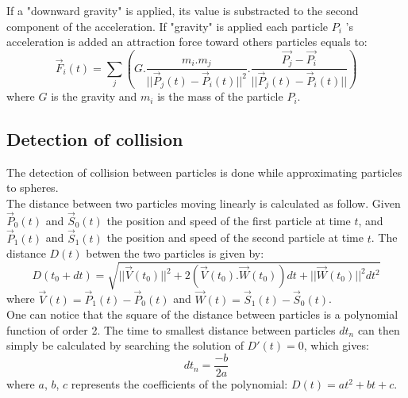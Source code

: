 If a "downward gravity" is applied, its value is substracted to the second component of the acceleration. If "gravity" is applied each particle $P_i$ 's acceleration is added an attraction force toward others particles equals to:\\
\begin{equation}
\overrightarrow{F}_i(t)=\sum_j\left(G.\frac{m_i.m_j}{||\overrightarrow{P}_j(t)-\overrightarrow{P}_i(t)||^2}.\frac{\overrightarrow{P_j}-\overrightarrow{P_i}}{||\overrightarrow{P}_j(t)-\overrightarrow{P}_i(t)||}\right)
\end{equation} 
where $G$ is the gravity and $m_i$ is the mass of the particle $P_i$.

\subsection{Detection of collision}

The detection of collision between particles is done while approximating particles to spheres.\\

The distance between two particles moving linearly is calculated as follow. Given $\overrightarrow{P}_0(t)$ and $\overrightarrow{S}_0(t)$ the position and speed of the first particle at time $t$, and $\overrightarrow{P}_1(t)$ and $\overrightarrow{S}_1(t)$ the position and speed of the second particle at time $t$. The distance $D(t)$ betwen the two particles is given by:\\
\begin{equation}
D(t_0+dt)=\sqrt{||\overrightarrow{V}(t_0)||^2+2(\overrightarrow{V}(t_0).\overrightarrow{W}(t_0))dt+||\overrightarrow{W}(t_0)||^2dt^2}
\end{equation}
where $\overrightarrow{V}(t)=\overrightarrow{P}_1(t)-\overrightarrow{P}_0(t)$ and $\overrightarrow{W}(t)=\overrightarrow{S}_1(t)-\overrightarrow{S}_0(t)$.\\

One can notice that the square of the distance between particles is a polynomial function of order 2. The time to smallest distance between particles $dt_n$ can then simply be calculated by searching the solution of $D'(t)=0$, which gives:\\
\begin{equation}
dt_n=\frac{-b}{2a}
\end{equation}
where $a$, $b$, $c$ represents the coefficients of the polynomial: $D(t)=at^2+bt+c$.\\

